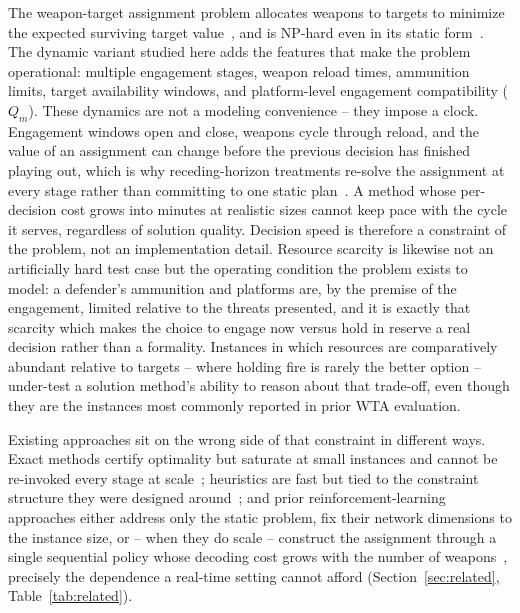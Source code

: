 The weapon-target assignment problem allocates weapons to targets to minimize the expected surviving target value~\cite{manne1958target}, and is NP-hard even in its static form~\cite{lloyd1986weapons}. The dynamic variant studied here adds the features that make the problem operational: multiple engagement stages, weapon reload times, ammunition limits, target availability windows, and platform-level engagement compatibility ($Q_m$). These dynamics are not a modeling convenience -- they impose a clock. Engagement windows open and close, weapons cycle through reload, and the value of an assignment can change before the previous decision has finished playing out, which is why receding-horizon treatments re-solve the assignment at every stage rather than committing to one static plan~\cite{zhang2020efficient,zhang2020dynamic}. A method whose per-decision cost grows into minutes at realistic sizes cannot keep pace with the cycle it serves, regardless of solution quality. Decision speed is therefore a constraint of the problem, not an implementation detail. Resource scarcity is likewise not an artificially hard test case but the operating condition the problem exists to model: a defender's ammunition and platforms are, by the premise of the engagement, limited relative to the threats presented, and it is exactly that scarcity which makes the choice to engage now versus hold in reserve a real decision rather than a formality. Instances in which resources are comparatively abundant relative to targets -- where holding fire is rarely the better option -- under-test a solution method's ability to reason about that trade-off, even though they are the instances most commonly reported in prior WTA evaluation.

Existing approaches sit on the wrong side of that constraint in different ways. Exact methods certify optimality but saturate at small instances and cannot be re-invoked every stage at scale~\cite{ahuja2007exact,kline2019weapon}; heuristics are fast but tied to the constraint structure they were designed around~\cite{kolitz1988analysis,lee2003genetic}; and prior reinforcement-learning approaches either address only the static problem, fix their network dimensions to the instance size, or -- when they do scale -- construct the assignment through a single sequential policy whose decoding cost grows with the number of weapons~\cite{na2023weapon,gaudet2023,wu2022dynamic,yoontransformer}, precisely the dependence a real-time setting cannot afford (Section~\ref{sec:related}, Table~\ref{tab:related}).

